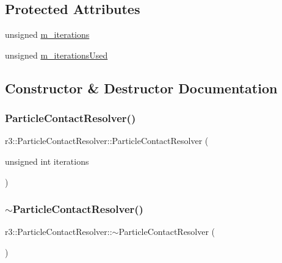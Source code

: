 \subsection*{Protected Attributes}
\begin{DoxyCompactItemize}
\item 
unsigned \mbox{\hyperlink{classr3_1_1_particle_contact_resolver_ae8b844211cf1c0f5e99191cee9f4a88f}{m\+\_\+iterations}}
\item 
unsigned \mbox{\hyperlink{classr3_1_1_particle_contact_resolver_a07536069a9a6a73c45794baf8579b845}{m\+\_\+iterations\+Used}}
\end{DoxyCompactItemize}


\subsection{Constructor \& Destructor Documentation}
\mbox{\label{classr3_1_1_particle_contact_resolver_a37050bf25f0607a9290444121c56ee8f}} 
\subsubsection{\texorpdfstring{Particle\+Contact\+Resolver()}{ParticleContactResolver()}}
{\footnotesize\ttfamily r3\+::\+Particle\+Contact\+Resolver\+::\+Particle\+Contact\+Resolver (\begin{DoxyParamCaption}\item[{unsigned int}]{iterations }\end{DoxyParamCaption})\hspace{0.3cm}{\ttfamily [explicit]}}

\mbox{\label{classr3_1_1_particle_contact_resolver_ae7754eccf43c97727f1ecfac643cbd5b}} 
\subsubsection{\texorpdfstring{$\sim$\+Particle\+Contact\+Resolver()}{~ParticleContactResolver()}}
{\footnotesize\ttfamily r3\+::\+Particle\+Contact\+Resolver\+::$\sim$\+Particle\+Contact\+Resolver (\begin{DoxyParamCaption}{ }\end{DoxyParamCaption})\hspace{0.3cm}{\ttfamily [default]}}




